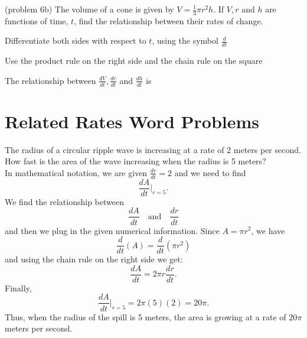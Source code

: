 \documentclass[handout]{ximera}
\begin{document}
\begin{problem}(problem 6b)
The volume of a cone is given by $V = \frac13 \pi r^2h$. If $V, r$ and $h$ are functions of time, $t$,
find the relationship between their rates of change.\\
\begin{hint}
Differentiate both sides with respect to $t$, using the symbol $\frac{d}{dt}$
\end{hint}
\begin{hint}
Use the product rule on the right side and the chain rule on the square
\end{hint}

The relationship between $\frac{dV}{dt}, \frac{dr}{dt}$ and $\frac{dh}{dt}$ is
\begin{multipleChoice}
\end{multipleChoice}
\end{problem}






\section{Related Rates Word Problems}




\begin{example}[example 7]
The radius of a circular ripple wave is increasing at a rate of 2 meters per second. How fast is the area of the wave 
increasing when the radius is 5 meters? \\
In mathematical notation, we are given $\frac{dr}{dt} = 2$ and we need to find
\[\frac{dA}{dt}\bigg|_{r = 5}.\]
We find the relationship between 
\[\frac{dA}{dt} \quad \text{and} \quad \frac{dr}{dt}\]
and then we plug in the given numerical information.
Since $A = \pi r^2$, we have
\[\frac{d}{dt} (A) = \frac{d}{dt}(\pi r^2)  \]
and using the chain rule on the right side we get:
\[\frac{dA}{dt}  = 2\pi r \frac{dr}{dt}.\]
Finally,
\[\frac{dA}{dt}\bigg|_{r = 5}  = 2\pi (5) (2) = 20\pi.\]
Thus, when the radius of the spill is 5 meters, the area is growing at a rate of $20\pi$ meters per second.
\end{example}
\end{document}
